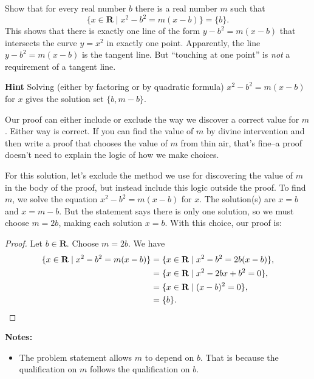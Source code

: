 \documentclass[12pt,fleqn,answers]{exam}
\newcommand{\reals}{\mathbf{R}}
\renewenvironment{solution}
  {\begin{shaded*}} %
  {\end{shaded*}}   %
\begin{document}
\begin{questions}
\question [10] Show that for every real number $b$ there is a real number $m$ such that
\begin{equation*}
 \{x \in \reals \mid x^2-b^2 = m (x-b) \} = \{b\}.
 \end{equation*}
 This shows that there is exactly one line of the form $y-b^2 = m (x-b)$ that intersects the curve $y=x^2$ in
 exactly one point. Apparently, the line  $y-b^2 = m (x-b)$ is the tangent line. But ``touching at one point'' is \emph{not}
 a requirement of a tangent line.

 \textbf{Hint} Solving (either by factoring or by quadratic formula) 
 $ x^2-b^2 = m (x-b)$ for $x$ gives the
 solution set $\{b,m-b\}$.

 \begin{solution} Our proof can either include or exclude the way we
  discover a correct value for $m$. Either way is correct.  If you can find the value of $m$
  by divine intervention and then write a proof that chooses the value
  of $m$ from thin air, that's fine--a proof doesn't need to explain
  the logic of how we make choices.

  \quad For this solution, let's exclude the method we use for discovering
  the value of $m$ in the body of the proof, but instead include this logic outside the 
  proof. To find $m$, we solve the equation $ x^2-b^2 = m (x-b)$ for $x$.
  The solution(s) are $x =b$ and $x = m-b$.  But the statement says 
  there is only one solution, so we must choose $m = 2 b$, making each solution $x = b$.
  With this choice, our proof is:

  \begin{proof} Let $b \in \reals$. Choose $m = 2 b$. We have
    \begin{align*}
      \{x \in \reals \mid x^2-b^2 = m (x-b) \} &= 
      \{x \in \reals \mid x^2-b^2 = 2 b (x-b) \}, \\
      &= \{x \in \reals \mid x^2 - 2 b x + b^2 = 0\},\\
      &= \{x \in \reals \mid (x-b)^2 = 0\},\\
      &= \{b\}. \qedhere
      \end{align*}
    \end{proof}
\noindent \textbf{Notes:}

\begin{itemize}
\item The problem statement allows $m$ to depend on $b$. That is
because the qualification on $m$ follows the qualification on $b$.


\end{itemize}
\end{solution}
\end{questions}
\end{document}
